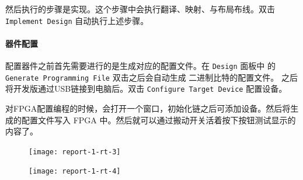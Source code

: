 \documentclass{ctexart}
\begin{document}
        然后执行的步骤是实现。这个步骤中会执行翻译、映射、与布局布线。双击
        \verb|Implement Design| 自动执行上述步骤。
        
        \paragraph{器件配置}
        
        配置器件之前首先需要进行的是生成对应的配置文件。在 \verb|Design| 面板中
        的 \verb|Generate Programming File|  双击之后会自动生成 二进制比特的配置文件。
        之后将开发版通过USB链接到电脑后。双击 \verb|Configure Target Device| 配置设备。
        
        对FPGA配置编程的时候，会打开一个窗口，初始化链之后可添加设备。然后将生成的配置文件写入
        FPGA 中。然后就可以通过搬动开关活着按下按钮测试显示的内容了。
        
        \begin{figure}
\centering
\texttt{[image: report-1-rt-3]}
\caption{}
\label{fig:report-1-rt-3}
\end{figure}
\begin{figure}
\centering
\texttt{[image: report-1-rt-4]}
\caption{}
\label{fig:report-1-rt-4}
\end{figure}
\end{document}
